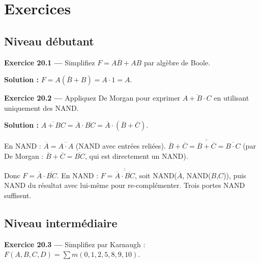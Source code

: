 \documentclass[12pt,a4paper,twoside]{book}
\begin{document}
\section*{Exercices}

\subsection*{Niveau débutant}

\textbf{Exercice 20.1 ---} Simplifiez $F = A\overline{B} + AB$ par algèbre de Boole.

\begin{pratique}
\textbf{Solution :} $F = A(\overline{B} + B) = A \cdot 1 = A$.
\end{pratique}

\textbf{Exercice 20.2 ---} Appliquez De Morgan pour exprimer $\overline{A + B \cdot C}$ en utilisant uniquement des NAND.

\begin{pratique}
\textbf{Solution :} $\overline{A + BC} = \overline{A} \cdot \overline{BC} = \overline{A} \cdot (\overline{B} + \overline{C})$.

En NAND : $\overline{A} = \overline{A \cdot A}$ (NAND avec entrées reliées). $\overline{B} + \overline{C} = \overline{\overline{\overline{B} + \overline{C}}} = \overline{B \cdot C}$ (par De Morgan : $\overline{B}+\overline{C} = \overline{BC}$, qui est directement un NAND).

Donc $F = \overline{A} \cdot \overline{BC}$. En NAND : $F = \overline{\overline{\overline{A} \cdot \overline{BC}}}$, soit NAND($\overline{A}$, NAND($B$,$C$)), puis NAND du résultat avec lui-même pour re-complémenter. Trois portes NAND suffisent.
\end{pratique}

\subsection*{Niveau intermédiaire}

\textbf{Exercice 20.3 ---} Simplifiez par Karnaugh : $F(A,B,C,D) = \sum m(0,1,2,5,8,9,10)$.
\end{document}
